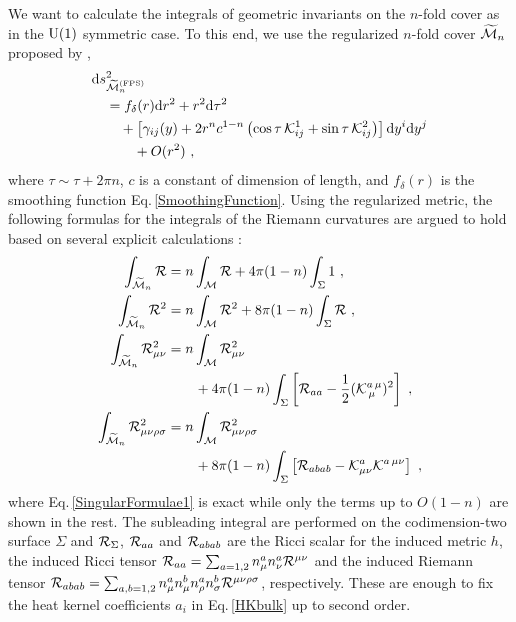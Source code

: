 We want to calculate the integrals of geometric invariants on the $n$-fold cover as in the $\mathrm{U}(1)$ symmetric case.
To this end, we use the regularized $n$-fold cover $\widetilde{{\cal M}}_n$ proposed by \textcite{Fursaev:2013fta},
\begin{align}
\begin{aligned}
	&\mathrm{d} s^2_{\widetilde{{\cal M}}_n^\text{(FPS)}} \\
	&\quad = f_\delta (r) \mathrm{d} r^2 + r^2 \mathrm{d} \tau^2 \\
		&\qquad + \left[ \gamma_{ij}(y) + 2r^n c^{1-n}\left( \cos\tau\, {\cal K}^1_{ij} + \sin\tau\,{\cal K}^2_{ij}\right) \right] \mathrm{d} y^i \mathrm{d} y^j \\
		&\qquad \quad  + O(r^2)\ ,
\end{aligned}
\end{align}
where $\tau\sim\tau + 2\pi n$, $c$ is a constant of dimension of length, and $f_\delta(r)$ is the smoothing function Eq.\,\eqref{SmoothingFunction}.
Using the regularized metric, the following formulas for the integrals of the Riemann curvatures are argued to hold based on several explicit calculations \cite{Fursaev:2013fta}:
\begin{align}
\int_{\widetilde{{\cal M}}_n} {\cal R} &= n \int_{{\cal M}} {\cal R} + 4\pi (1-n) \int_\Sigma 1 \ ,\label{SingularFormulae1}\\
\int_{\widetilde{{\cal M}}_n} {\cal R}^2 &= n \int_{{\cal M}} {\cal R}^2 + 8\pi (1-n) \int_\Sigma 
{\cal R} \ , \label{SingularFormulae2}\\
\int_{\widetilde{{\cal M}}_n} {\cal R}_{\mu\nu}^2 &= n \int_{{\cal M}} {\cal R}_{\mu\nu}^2 \nonumber\\
	&\qquad + 4\pi (1-n) \int_\Sigma \left[{\cal R}_{aa} - \frac{1}{2}({\cal K}^{a\,\mu}_{\,\mu})^2\right] \ , \label{SingularFormulae3}\\
\int_{\widetilde{{\cal M}}_n} {\cal R}_{\mu\nu\rho\sigma}^2 &= n \int_{{\cal M}} {\cal R}_{\mu\nu\rho\sigma}^2 \nonumber\\
	&\qquad + 8\pi (1-n) \int_\Sigma \left[ {\cal R}_{abab} - {\cal K}^a_{\mu\nu} {\cal K}^{a\, \mu\nu} \right] \ , \label{SingularFormulae4}
\end{align}
where Eq.\,\eqref{SingularFormulae1} is exact while only the terms up to $O(1-n)$ are shown in the rest.
The subleading integral are performed on the codimension-two surface $\Sigma$ and ${\cal R}_\Sigma$, ${\cal R}_{aa}$ and ${\cal R}_{abab}$ are the Ricci scalar for the induced metric $h$, the induced Ricci tensor ${\cal R}_{aa} = \sum_{a=1,2} n^a_\mu n^a_\nu {\cal R}^{\mu\nu}$ and the induced Riemann tensor ${\cal R}_{abab} = \sum_{a,b=1,2} n^a_\mu n^b_\mu n^a_\rho n^b_\sigma {\cal R}^{\mu\nu\rho\sigma}$, respectively.
These are enough to fix the heat kernel coefficients $a_i$ in Eq.\,\eqref{HKbulk} up to second order.

